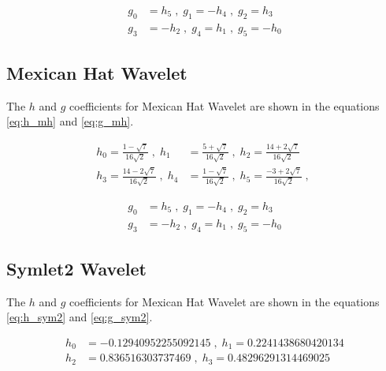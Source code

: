 \documentclass[12pt]{article}
\begin{document}
	\begin{equation}
		\begin{aligned}
		g_0 &= h_5 \;,\; g_1 = -h_4 \;,\; g_2 = h_3 \\
		g_3 &= -h_2 \;,\; g_4 = h_1 \;,\; g_5 = -h_0
		\end{aligned}
		\label{eq:g_db6}
	\end{equation}
	
	\subsection{Mexican Hat Wavelet}
	The  $h$ and $g$ coefficients for Mexican Hat Wavelet are shown in the equations \ref{eq:h_mh} and \ref{eq:g_mh}.
	
	\begin{equation}
		\begin{aligned}
			h_0 = \frac{1-\sqrt7}{16\sqrt2} \;,\; h_1 &= \frac{5+\sqrt7}{16\sqrt2} \;,\; h_2 = \frac{14+2\sqrt7}{16\sqrt2} \\
			h_3 = \frac{14-2\sqrt7}{16\sqrt2} \;,\; h_4 &= \frac{1-\sqrt7}{16\sqrt2} \;,\; h_5 = \frac{-3+2\sqrt7}{16\sqrt2} \;,\;
		\end{aligned}
		\label{eq:h_mh}
	\end{equation}
	
	\begin{equation}
		\begin{aligned}
			g_0 &= h_5 \;,\; g_1 = -h_4 \;,\; g_2 = h_3 \\
			g_3 &= -h_2 \;,\; g_4 = h_1 \;,\; g_5 = -h_0
		\end{aligned}
		\label{eq:g_mh}
	\end{equation}
	
	\subsection{Symlet2 Wavelet}
	
	The  $h$ and $g$ coefficients for Mexican Hat Wavelet are shown in the equations \ref{eq:h_sym2} and \ref{eq:g_sym2}.
	
	\begin{equation}
		\begin{aligned}
			h_0 &= -0.12940952255092145 \;,\; h_1 = 0.2241438680420134 \\
			h_2 &= 0.836516303737469 \;,\; h_3 = 0.48296291314469025
		\end{aligned}
		\label{eq:h_sym2}
	\end{equation}
	
\end{document}

